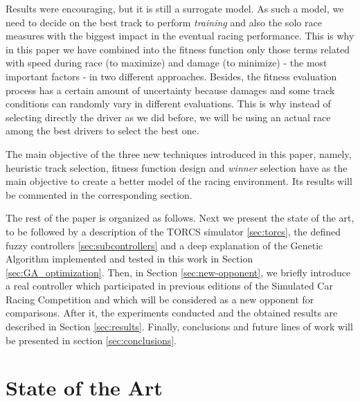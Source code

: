 \documentclass[conference]{IEEEtran}
\begin{document}
Results were encouraging, but it is still a surrogate model. As such a
model, we need to decide on the best track to perform {\em training}
and also the solo race measures with the biggest impact in the
eventual racing performance. This is why in this paper we have
combined into the fitness function only those terms related with speed during race (to maximize) and damage (to minimize) - the most important factors - in two different approaches.
Besides, the fitness evaluation process has a certain amount of uncertainty because damages and some track conditions can randomly vary in different
evaluations. This is why instead of selecting directly the driver as
we did before, we will be using an actual race among the best drivers
to select the best one.

The main objective of the three new techniques introduced in this
paper, namely, heuristic track selection, fitness function design and
{\em winner} selection have as the main objective to create a better
model of the racing environment. Its results will be commented in the
corresponding section. 




The rest of the paper is organized as follows. Next we present the
state of the art, to be followed by a description of the TORCS
simulator \ref{sec:torcs}, the defined fuzzy controllers \ref{sec:subcontrollers} and a deep explanation of the Genetic Algorithm implemented and tested in this work in Section \ref{sec:GA_optimization}. Then, in Section \ref{sec:new-opponent}, we briefly introduce a real controller which participated in previous editions of the Simulated Car Racing Competition and which will be considered as a new opponent for comparisons.
After it, the experiments conducted and the obtained results are described in Section \ref{sec:results}. Finally, conclusions and future lines of work will be presented in section \ref{sec:conclusions}.


\section{State of the Art}
\label{sec:soa}
\end{document}
